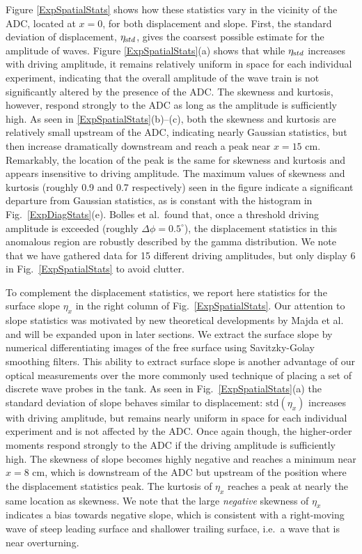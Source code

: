\documentclass[11pt]{article}
\newcommand{\etastd}{\eta_{\text std}}
\newcommand{\std}{\text{std}}
\newcommand{\Dphi}{\Delta \phi}
\begin{document}
	Figure \ref{ExpSpatialStats} shows how these statistics vary in the vicinity of the ADC, located at $x = 0$, for both displacement and slope. First, the standard deviation of displacement, $\etastd$, gives the coarsest possible estimate for the amplitude of waves. Figure \ref{ExpSpatialStats}(a) shows that while $\etastd$ increases with driving amplitude, it remains relatively uniform in space for each individual experiment, indicating that the overall amplitude of the wave train is not significantly altered by the presence of the ADC. The skewness and kurtosis, however, respond strongly to the ADC as long as the amplitude is sufficiently high. As seen in \ref{ExpSpatialStats}(b)--(c), both the skewness and kurtosis are relatively small upstream of the ADC, indicating nearly Gaussian statistics, but then increase dramatically downstream and reach a peak near $x = 15$ cm. Remarkably, the location of the peak is the same for skewness and kurtosis and appears insensitive to driving amplitude. The maximum values of skewness and kurtosis (roughly 0.9 and 0.7 respectively) seen in the figure indicate a significant departure from Gaussian statistics, as is constant with the histogram in Fig.~\ref{ExpDiagStats}(e). Bolles et al.~found that, once a threshold driving amplitude is exceeded (roughly $\Dphi = 0.5^{\circ}$), the displacement statistics in this anomalous region are robustly described by the gamma distribution. We note that we have gathered data for 15 different driving amplitudes, but only display 6 in Fig.~\ref{ExpSpatialStats} to avoid clutter. 
 
	To complement the displacement statistics, we report here statistics for the surface slope $\eta_x$ in the right column of Fig.~\ref{ExpSpatialStats}. Our attention to slope statistics was motivated by new theoretical developments by Majda et al.~\cite{majda2019} and will be expanded upon in later sections. We extract the surface slope by numerical differentiating images of the free surface using Savitzky-Golay smoothing filters. This ability to extract surface slope is another advantage of our optical measurements over the more commonly used technique of placing a set of discrete wave probes in the tank. As seen in Fig.~\ref{ExpSpatialStats}(a) the standard deviation of slope behaves similar to displacement: $\std(\eta_x)$ increases with driving amplitude, but remains nearly uniform in space for each individual experiment and is not affected by the ADC. Once again though, the higher-order moments respond strongly to the ADC if the driving amplitude is sufficiently high. The skewness of slope becomes highly negative and reaches a minimum near $x = 8$ cm, which is downstream of the ADC but upstream of the position where the displacement statistics peak. The kurtosis of $\eta_x$ reaches a peak at nearly the same location as skewness. We note that the large {\em negative} skewness of $\eta_x$ indicates a bias towards negative slope, which is consistent with a right-moving wave of steep leading surface and shallower trailing surface, i.e.~a wave that is near overturning.
\end{document}
